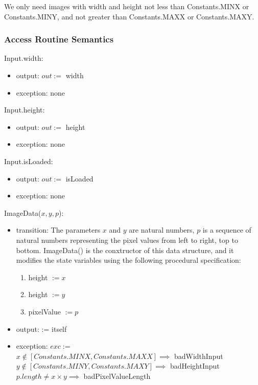 \documentclass[12pt, titlepage]{article}
\begin{document}
We only need images with width and height not less than Constants.MINX or
Constants.MINY, and not greater than Constants.MAXX or Constants.MAXY.

\subsubsection{Access Routine Semantics}

\noindent Input.width:
\begin{itemize}
\item output: $out:=$ width 
\item exception: none 
\end{itemize}

\noindent Input.height:
\begin{itemize}
\item output: $out:=$ height 
\item exception: none 
\end{itemize}

\noindent Input.isLoaded: 
\begin{itemize}
\item output: $out:=$ isLoaded 
\item exception: none 
\end{itemize}

\noindent ImageData($x, y, p$):
\begin{itemize}
\item transition: 
The parameters $x$ and $y$ are natural numbers, $p$ is a sequence of natural
numbers representing the pixel values from left to right, top to bottom.
ImageData() is the conxtructor of this data structure, and it modifies
the state variables using the following procedural specification:
\begin{enumerate}
    \item
    height $:= x$
    \item
    height $:= y$
    \item
    pixelValue $:= p$
\end{enumerate}
\item output: := itself
\item exception: $exc :=$\\
$x \not\in [Constants.MINX,Constants.MAXX] \implies$ badWidthInput\\
$y \not\in [Constants.MINY,Constants.MAXY] \implies$ badHeightInput\\
$p.length \not= x \times y \implies$ badPixelValueLength
\end{itemize}
\end{document}
